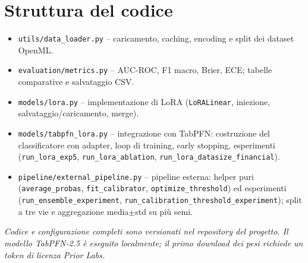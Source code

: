 \documentclass[11pt,a4paper]{article}
\begin{document}
\section{Struttura del codice}
\begin{itemize}[nosep]
  \item \texttt{utils/data\_loader.py} -- caricamento, caching, encoding e split
  dei dataset OpenML.
  \item \texttt{evaluation/metrics.py} -- AUC-ROC, F1 macro, Brier, ECE; tabelle
  comparative e salvataggio CSV.
  \item \texttt{models/lora.py} -- implementazione di LoRA (\texttt{LoRALinear},
  iniezione, salvataggio/caricamento, merge).
  \item \texttt{models/tabpfn\_lora.py} -- integrazione con TabPFN: costruzione
  del classificatore con adapter, loop di training, early stopping, esperimenti
  (\texttt{run\_lora\_exp5}, \texttt{run\_lora\_ablation},
  \texttt{run\_lora\_datasize\_financial}).
  \item \texttt{pipeline/external\_pipeline.py} -- pipeline esterna: helper puri
  (\texttt{average\_probas}, \texttt{fit\_calibrator}, \texttt{optimize\_threshold})
  ed esperimenti (\texttt{run\_ensemble\_experiment},
  \texttt{run\_calibration\_threshold\_experiment}); split a tre vie e
  aggregazione media$\pm$std su più semi.
\end{itemize}

\noindent\textit{Codice e configurazione completi sono versionati nel repository
del progetto. Il modello TabPFN-2.5 è eseguito localmente; il primo download dei
pesi richiede un token di licenza Prior Labs.}
\end{document}
